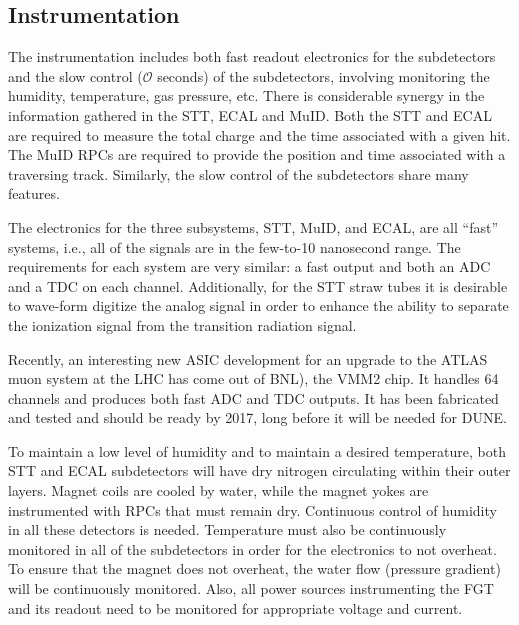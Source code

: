\subsection{Instrumentation}
\label{cdrsec:detectors-nd-ref-fgt-instrum}

The instrumentation includes both fast readout electronics for the subdetectors
and the slow control ($\mathcal{O}$ seconds) of the subdetectors, involving monitoring the humidity, 
temperature, gas pressure, etc.
There is considerable synergy in the information gathered in the STT, ECAL and MuID. 
Both the STT and ECAL are required to measure the total charge and the time associated with a 
given hit. The MuID RPCs are required to provide the position and time associated with 
a traversing track. Similarly, the slow control of the subdetectors
share many features.

The electronics for the three subsystems, STT, MuID, and ECAL, are all ``fast'' systems, 
i.e., all of the signals are in the few-to-10 nanosecond range. 
The requirements for each system are very similar: a fast output and both an ADC  
and a TDC on each channel.  Additionally, for the STT straw tubes it 
is desirable to wave-form digitize the analog signal in order to enhance the ability to separate 
the ionization signal from the transition radiation signal. 

Recently, an interesting new ASIC development for an upgrade to the ATLAS muon system at the LHC
has come out of BNL), the VMM2 chip. %
 It handles 64 channels and produces both fast ADC and TDC outputs.
It has been fabricated and tested and should be ready by 2017, long before it will be needed for DUNE.

To maintain a low level of 
humidity and to maintain a desired temperature, both STT and ECAL subdetectors
will have dry nitrogen circulating within their outer layers.  Magnet coils are cooled by water, 
while the magnet yokes are instrumented with RPCs that must remain dry. Continuous control of 
humidity in all these detectors is needed.
Temperature must also be continuously monitored in all of the subdetectors
in order for the electronics to not overheat. 
To ensure that the magnet does not overheat, the water flow (pressure gradient) will be continuously monitored.  
Also, all power sources instrumenting the FGT and its readout need to be monitored for 
appropriate voltage and current.


